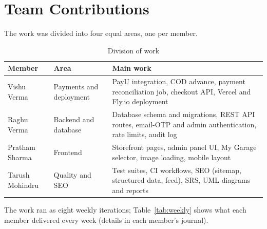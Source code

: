 \documentclass{tietreport}
\begin{document}
\section{Team Contributions}

The work was divided into four equal areas, one per member.

\begin{table}[H]
\centering\small
\begin{tabularx}{\linewidth}{l l X}
\toprule
\textbf{Member} & \textbf{Area} & \textbf{Main work} \\
\midrule
Vishu Verma & Payments and deployment & PayU integration, COD advance, payment reconciliation job, checkout API, Vercel and Fly.io deployment \\
Raghu Verma & Backend and database & Database schema and migrations, REST API routes, email-OTP and admin authentication, rate limits, audit log \\
Pratham Sharma & Frontend & Storefront pages, admin panel UI, My Garage selector, image loading, mobile layout \\
Tarush Mohindru & Quality and SEO & Test suites, CI workflows, SEO (sitemap, structured data, feed), SRS, UML diagrams and reports \\
\bottomrule
\end{tabularx}
\caption{Division of work}
\label{tab:team}
\end{table}

The work ran as eight weekly iterations; Table~\ref{tab:weekly} shows what
each member delivered every week (details in each member's journal).
\end{document}
